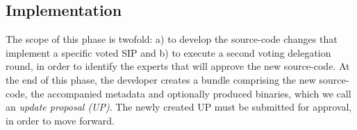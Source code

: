 

\subsection{Implementation}

The scope of this phase is twofold: a) to develop the source-code changes that implement a specific voted SIP and b) to execute a second voting delegation round, in order to identify the experts that will approve the new source-code. At the end of this phase, the developer creates a bundle comprising the new source-code, the accompanied metadata and optionally produced binaries, which we call an \emph{update proposal (UP)}. The newly created UP must be submitted for approval, in order to move forward.

